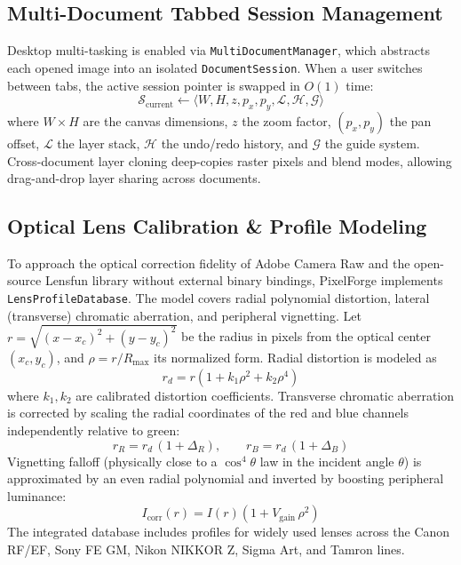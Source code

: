 \documentclass[10pt,journal,compsoc]{IEEEtran}
\begin{document}
\subsection{Multi-Document Tabbed Session Management}
Desktop multi-tasking is enabled via \texttt{MultiDocumentManager}, which abstracts each opened image into an isolated \texttt{DocumentSession}. When a user switches between tabs, the active session pointer is swapped in $O(1)$ time:
\begin{equation}
\mathcal{S}_{\text{current}} \longleftarrow \langle W, H, z, p_x, p_y, \mathcal{L}, \mathcal{H}, \mathcal{G} \rangle
\end{equation}
where $W \times H$ are the canvas dimensions, $z$ the zoom factor, $(p_x, p_y)$ the pan offset, $\mathcal{L}$ the layer stack, $\mathcal{H}$ the undo/redo history, and $\mathcal{G}$ the guide system. Cross-document layer cloning deep-copies raster pixels and blend modes, allowing drag-and-drop layer sharing across documents.

\subsection{Optical Lens Calibration \& Profile Modeling}
To approach the optical correction fidelity of Adobe Camera Raw and the open-source Lensfun library without external binary bindings, PixelForge implements \texttt{LensProfileDatabase}. The model covers radial polynomial distortion, lateral (transverse) chromatic aberration, and peripheral vignetting. Let $r = \sqrt{(x - x_c)^2 + (y - y_c)^2}$ be the radius in pixels from the optical center $(x_c, y_c)$, and $\rho = r / R_{\max}$ its normalized form. Radial distortion is modeled as
\begin{equation}
r_d = r \left(1 + k_1 \rho^2 + k_2 \rho^4\right)
\end{equation}
where $k_1, k_2$ are calibrated distortion coefficients. Transverse chromatic aberration is corrected by scaling the radial coordinates of the red and blue channels independently relative to green:
\begin{equation}
r_R = r_d \,(1 + \Delta_R), \qquad r_B = r_d \,(1 + \Delta_B)
\end{equation}
Vignetting falloff (physically close to a $\cos^4\theta$ law in the incident angle $\theta$) is approximated by an even radial polynomial and inverted by boosting peripheral luminance:
\begin{equation}
I_{\text{corr}}(r) = I(r) \left(1 + V_{\text{gain}}\, \rho^2\right)
\end{equation}
The integrated database includes profiles for widely used lenses across the Canon RF/EF, Sony FE GM, Nikon NIKKOR Z, Sigma Art, and Tamron lines.
\end{document}
